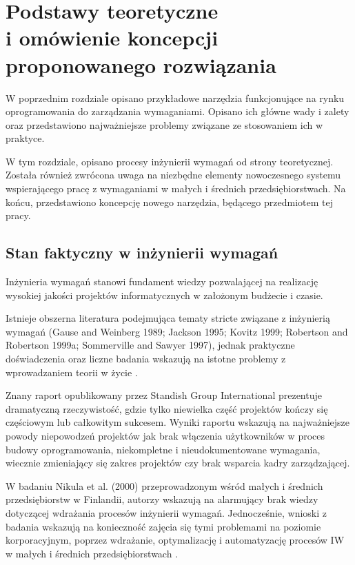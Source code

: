 \chapter{Podstawy teoretyczne \\i omówienie koncepcji proponowanego rozwiązania}
  
  W poprzednim rozdziale opisano przykładowe narzędzia funkcjonujące na rynku oprogramowania do zarządzania wymaganiami. Opisano ich główne wady i zalety oraz przedstawiono najważniejsze problemy związane ze stosowaniem ich w praktyce.

  W tym rozdziale, opisano procesy inżynierii wymagań od strony teoretycznej. Została również zwrócona uwaga na niezbędne elementy nowoczesnego systemu wspierającego pracę z wymaganiami w małych i średnich przedsiębiorstwach. Na końcu, przedstawiono koncepcję nowego narzędzia, będącego przedmiotem tej pracy.
  
  \section{Stan faktyczny w inżynierii wymagań}

    Inżynieria wymagań stanowi fundament wiedzy pozwalającej na realizację wysokiej jakości projektów informatycznych w założonym budżecie i czasie. 

    Istnieje obszerna literatura podejmująca tematy stricte związane z inżynierią wymagań (Gause and Weinberg 1989; Jackson 1995; Kovitz 1999; Robertson and Robertson 1999a; Sommerville and Sawyer 1997), jednak praktyczne doświadczenia oraz liczne badania wskazują na istotne problemy z wprowadzaniem teorii w życie \cite{Boehm06, Niku00, Standish94}.

    Znany raport opublikowany przez Standish Group International \cite{Standish94} prezentuje dramatyczną rzeczywistość, gdzie tylko niewielka część projektów kończy się częściowym lub całkowitym sukcesem. Wyniki raportu wskazują na najważniejsze powody niepowodzeń projektów jak brak włączenia użytkowników w proces budowy oprogramowania, niekompletne i nieudokumentowane wymagania, wiecznie zmieniający się zakres projektów czy brak wsparcia kadry zarządzającej.      
    
    W badaniu Nikula et al. (2000) przeprowadzonym wśród małych i średnich przedsiębiorstw w Finlandii, autorzy wskazują na alarmujący brak wiedzy dotyczącej wdrażania procesów inżynierii wymagań. Jednocześnie, wnioski z badania wskazują na konieczność zajęcia się tymi problemami na poziomie korporacyjnym, poprzez wdrażanie, optymalizację i automatyzację procesów IW w małych i średnich przedsiębiorstwach \cite{Niku00}.
    
